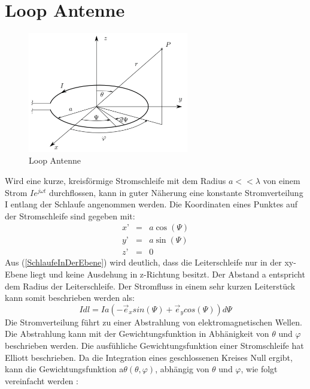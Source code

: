 
\section{Loop Antenne}\label{sec:LoopAntenneTheorie}
\begin{figure}[h]
	\centering
	\includegraphics[width=7cm]{content/bilder/Loop_EMANT_S45.pdf}%
	\caption{Loop Antenne}
	\label{LoopAntenne}
\end{figure}
Wird eine kurze, kreisförmige Stromschleife mit dem Radius $a<<\lambda$ von einem Strom $Ie^{j\omega t}$ durchflossen, kann in guter Näherung eine konstante Stromverteilung I entlang der Schlaufe angenommen werden. Die Koordinaten eines Punktes auf der Stromschleife sind gegeben mit:
\begin{eqnarray}
x’ &=& a \cos(\Psi)\\
y’ &=& a \sin(\Psi)\\
z’ &=& 0\label{SchlaufeInDerEbene}
\end{eqnarray}
Aus  (\ref{SchlaufeInDerEbene}) wird deutlich, dass die Leiterschleife nur in der xy-Ebene liegt und keine Ausdehung in z-Richtung besitzt. Der Abstand a entspricht dem Radius der Leiterschleife. Der Stromfluss in einem sehr kurzen Leiterstück kann somit beschrieben werden als:
\begin{equation}
I dl= Ia(- \vec e_{x}sin(\Psi)+\vec e_{y}cos(\Psi))d\Psi
\end{equation}
Die Stromverteilung führt zu einer Abstrahlung von elektromagnetischen Wellen. Die Abstrahlung kann mit der Gewichtungsfunktion in Abhänigkeit von $\theta$ und $\varphi$ beschrieben werden. Die ausfühliche Gewichtungsfunktion einer Stromschleife hat Elliott \cite{elliott1981antenna} beschrieben. Da die Integration eines geschlossenen Kreises Null ergibt, kann die Gewichtungsfunktion a$\theta(\theta, \varphi)$, abhängig von $\theta$ und $\varphi$, wie folgt vereinfacht werden \cite{Emant}:
